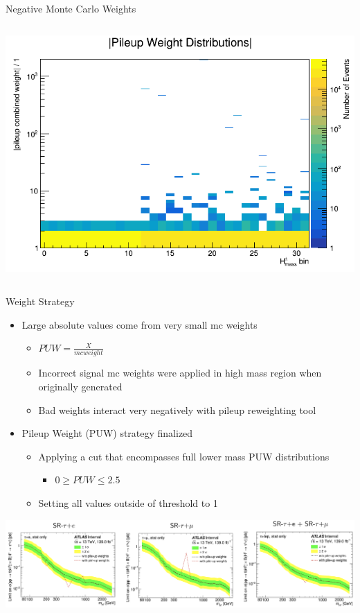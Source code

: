 \documentclass[aspectratio=169,xcolor=table]{beamer}
\begin{document}
\begin{frame}[t]{Negative Monte Carlo Weights}
\begin{columns}
        \includegraphics[width=\textwidth,keepaspectratio=true]{pileup_histo_log.png}
      \end{columns}
    \end{frame}

    \begin{frame}[t]{Weight Strategy}
      \begin{itemize}
        \item Large absolute values come from very small mc weights 
        \begin{itemize}
          \item $PUW = \frac{X}{mc weight}$
          \item Incorrect signal mc weights were applied in high mass region when originally generated
          \item Bad weights interact very negatively with pileup reweighting tool
        \end{itemize}
        \item Pileup Weight (PUW) strategy finalized
        \begin{itemize}
          \item Applying a cut that encompasses full lower mass PUW distributions
          \begin{itemize}
            \item $ 0 \geq PUW \leq 2.5$
          \end{itemize}
          \item Setting all values outside of threshold to 1
        \end{itemize}
      \end{itemize}
      \centering
      \includegraphics[width=.75\linewidth,keepaspectratio=true]{Limits_PileupWeight_Comparison.png}
    \end{frame}
\end{document}
